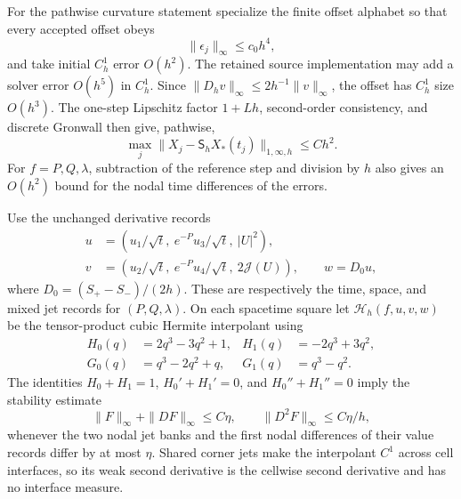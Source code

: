 \documentclass[11pt]{article}
\theoremstyle{definition}
\theoremstyle{remark}
\begin{document}
For the pathwise curvature statement specialize the finite offset alphabet so
that every accepted offset obeys
\begin{equation}
 \|\epsilon_j\|_\infty\le c_0h^4,
 \label{eq:supp-gowdy-offset-cap}
\end{equation}
and take initial $C_h^1$ error $O(h^2)$.  The retained source implementation may
add a solver error $O(h^5)$ in $C_h^1$.  Since
$\|D_hv\|_\infty\le2h^{-1}\|v\|_\infty$, the offset has $C_h^1$ size
$O(h^3)$.  The one-step Lipschitz factor $1+Lh$, second-order consistency, and
discrete Gronwall then give, pathwise,
\begin{equation}
 \boxed{
 \max_j\|X_j-\mathsf S_hX_*(t_j)\|_{1,\infty,h}\le Ch^2.}
 \label{eq:supp-gowdy-pathwise-c1}
\end{equation}
For $f=P,Q,\lambda$, subtraction of the reference step and division by $h$
also gives an $O(h^2)$ bound for the nodal time differences of the errors.

Use the unchanged derivative records
\begin{align}
 u&=\left(u_1/\sqrt t,\ e^{-P}u_3/\sqrt t,\ |U|^2\right),\nonumber\\
 v&=\left(u_2/\sqrt t,\ e^{-P}u_4/\sqrt t,\ 2\mathcal J(U)\right),
 \qquad w=D_0u,
 \label{eq:supp-gowdy-hermite-jets}
\end{align}
where $D_0=(S_+-S_-)/(2h)$.  These are respectively the time, space, and mixed
jet records for $(P,Q,\lambda)$.  On each spacetime square let
$\mathcal H_h(f,u,v,w)$ be the tensor-product cubic Hermite interpolant using
\begin{align*}
 H_0(q)&=2q^3-3q^2+1,&H_1(q)&=-2q^3+3q^2,\\
 G_0(q)&=q^3-2q^2+q,&G_1(q)&=q^3-q^2.
\end{align*}
The identities $H_0+H_1=1$, $H_0'+H_1'=0$, and
$H_0''+H_1''=0$ imply the stability estimate
\begin{equation}
 \|F\|_\infty+\|DF\|_\infty\le C\eta,
 \qquad \|D^2F\|_\infty\le C\eta/h,
 \label{eq:supp-gowdy-hermite-second-jet}
\end{equation}
whenever the two nodal jet banks and the first nodal differences of their value
records differ by at most $\eta$.  Shared corner jets make the interpolant
$C^1$ across cell interfaces, so its weak second derivative is the cellwise
second derivative and has no interface measure.
\end{document}
